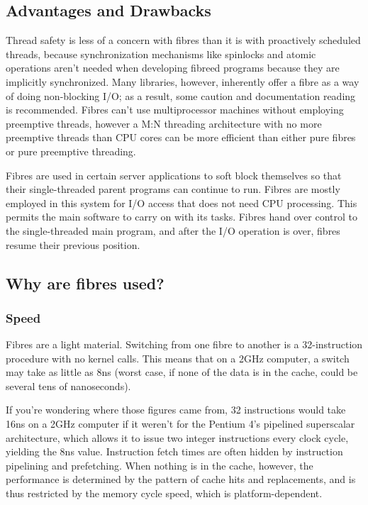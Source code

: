 \subsection{Advantages and Drawbacks}
Thread safety is less of a concern with fibres than it is with proactively scheduled threads, because synchronization mechanisms like spinlocks and atomic operations aren't needed when developing fibreed programs because they are implicitly synchronized. Many libraries, however, inherently offer a fibre as a way of doing non-blocking I/O; as a result, some caution and documentation reading is recommended. Fibres can't use multiprocessor machines without employing preemptive threads, however a M:N threading architecture with no more preemptive threads than CPU cores can be more efficient than either pure fibres or pure preemptive threading.

Fibres are used in certain server applications to soft block themselves so that their single-threaded parent programs can continue to run. Fibres are mostly employed in this system for I/O access that does not need CPU processing. This permits the main software to carry on with its tasks. Fibres hand over control to the single-threaded main program, and after the I/O operation is over, fibres resume their previous position.

\subsection{Why are fibres used?}

\subsubsection{Speed}
Fibres are a light material. Switching from one fibre to another is a 32-instruction procedure with no kernel calls. This means that on a 2GHz computer, a switch may take as little as 8ns (worst case, if none of the data is in the cache, could be several tens of nanoseconds).

If you're wondering where those figures came from, 32 instructions would take 16ns on a 2GHz computer if it weren't for the Pentium 4's {\textquotedbl}pipelined superscalar{\textquotedbl} architecture, which allows it to issue two integer instructions every clock cycle, yielding the 8ns value. Instruction fetch times are often hidden by instruction pipelining and prefetching. When nothing is in the cache, however, the performance is determined by the pattern of cache hits and replacements, and is thus restricted by the memory cycle speed, which is platform-dependent.

